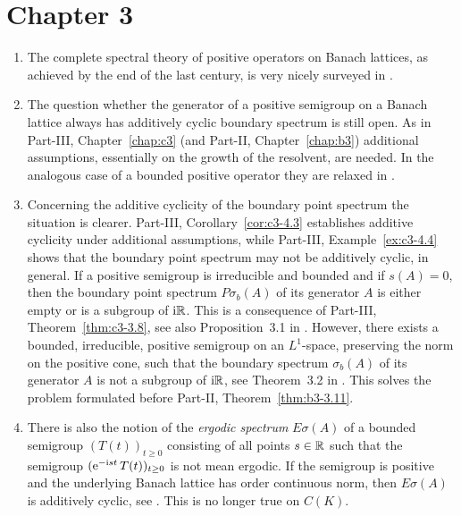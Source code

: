 \section*{Chapter 3}
\begin{enumerate}

\item 
The complete spectral theory of positive operators on Banach lattices, as achieved by the end of the last century,
is very nicely surveyed in \textcite{zbmath00774970}.

\item 
The question whether the generator of a positive semigroup on a Banach lattice always has additively cyclic boundary spectrum is still open. 
As in Part-III, Chapter~\ref{chap:c3}  (and Part-II, Chapter~\ref{chap:b3}) additional assumptions, essentially on the growth of the resolvent, are needed. 
In the analogous case of a bounded positive operator they are relaxed in \textcite{zbmath06591946}.


\item 
Concerning the additive cyclicity of the boundary point spectrum the situation is clearer. 
Part-III, Corollary~\ref{cor:c3-4.3} establishes additive cyclicity under additional assumptions, while 
Part-III, Example~\ref{ex:c3-4.4} shows that the boundary point spectrum may not be additively cyclic, in general.
If a positive semigroup is irreducible and bounded and if $s(A) = 0$,  then the boundary point spectrum $P\sigma_{b}(A)$ of its generator $A$ is either empty or is a subgroup of $\mathrm{i}\mathbb{R}$. 
This is a consequence of Part-III, Theorem~\ref{thm:c3-3.8}, see also Proposition~3.1 in \textcite{zbmath07423250}.
However, there exists a bounded, irreducible, positive semigroup on an $L^{1}$-space,  preserving the norm  on the positive cone, such that the  boundary spectrum 
$\sigma_{b}(A)$ of its generator $A$ 
is not a subgroup of $\mathrm{i}\mathbb{R}$, see Theorem~3.2 in \textcite{zbmath07423250}.
This solves the problem formulated before  Part-II, Theorem~\ref{thm:b3-3.11}.

\item 
There is also the notion of the \emph{ergodic spectrum} $E\sigma(A)$ of a bounded semigroup $(T(t))_{t\geq 0}$ consisting of all points $s\in\mathbb{R}$ such that the semigroup 
$(\mathrm{e}^{-\im st}\,T(t))_{t\geq 0}$
is not mean ergodic. 
If the semigroup is positive and the underlying Banach lattice has order continuous norm, then $E\sigma(A)$ is additively cyclic,
see \textcite{zbmath00763800}. 
This is no longer true on $C(K)$. 


\end{enumerate}

